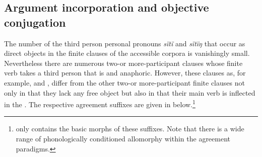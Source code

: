 \documentclass[output=paper]{LSP/langsci}
\begin{document}
\subsection{Argument incorporation and objective conjugation}\label{12-wr-sec:3-3}

The number of the third person personal pronouns \textit{sïtï} and \textit{sïtïŋ} that occur as direct objects in the finite clauses of the accessible corpora is vanishingly small. Nevertheless there are numerous two-or more-participant clauses whose finite verb takes a third person  that is  and anaphoric. However, these clauses as, for example,  and , differ from the other two-or more-participant finite clauses not only in that they lack any free object but also in that their main verb is inflected in the . The respective agreement suffixes are given in  below.\footnote{ only contains the basic morphs of these suffixes. Note that there is a wide range of phonologically conditioned allomorphy within the  agreement paradigms.} %

\end{document}
